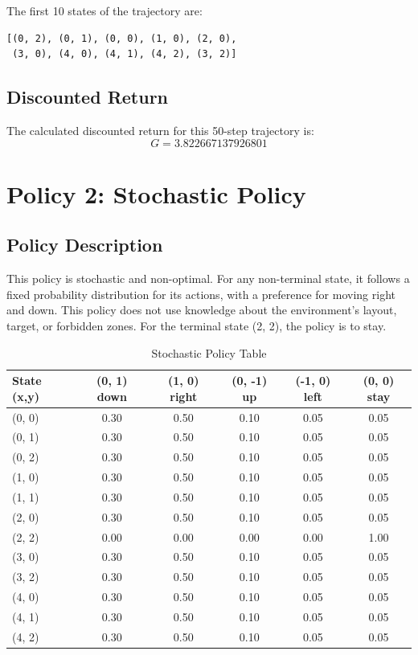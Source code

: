 \documentclass[12pt]{article}
\begin{document}
The first 10 states of the trajectory are:
\begin{verbatim}
[(0, 2), (0, 1), (0, 0), (1, 0), (2, 0),
 (3, 0), (4, 0), (4, 1), (4, 2), (3, 2)]
\end{verbatim}


\subsection{Discounted Return}
The calculated discounted return for this 50-step trajectory is:
$$ G = 3.822667137926801 $$

\newpage
\section{Policy 2: Stochastic Policy}

\subsection{Policy Description}
This policy is stochastic and non-optimal. For any non-terminal state, it follows a fixed probability distribution for its actions, with a preference for moving right and down. This policy does not use knowledge about the environment's layout, target, or forbidden zones. For the terminal state (2, 2), the policy is to stay.

\begin{table}[h!]
\centering
\caption{Stochastic Policy Table}
\begin{tabular}{lccccc}
\toprule
\textbf{State (x,y)} & \textbf{(0, 1) down} & \textbf{(1, 0) right} & \textbf{(0, -1) up} & \textbf{(-1, 0) left} & \textbf{(0, 0) stay} \\
\midrule
(0, 0) & 0.30 & 0.50 & 0.10 & 0.05 & 0.05 \\
(0, 1) & 0.30 & 0.50 & 0.10 & 0.05 & 0.05 \\
(0, 2) & 0.30 & 0.50 & 0.10 & 0.05 & 0.05 \\
(1, 0) & 0.30 & 0.50 & 0.10 & 0.05 & 0.05 \\
(1, 1) & 0.30 & 0.50 & 0.10 & 0.05 & 0.05 \\
(2, 0) & 0.30 & 0.50 & 0.10 & 0.05 & 0.05 \\
(2, 2) & 0.00 & 0.00 & 0.00 & 0.00 & 1.00 \\
(3, 0) & 0.30 & 0.50 & 0.10 & 0.05 & 0.05 \\
(3, 2) & 0.30 & 0.50 & 0.10 & 0.05 & 0.05 \\
(4, 0) & 0.30 & 0.50 & 0.10 & 0.05 & 0.05 \\
(4, 1) & 0.30 & 0.50 & 0.10 & 0.05 & 0.05 \\
(4, 2) & 0.30 & 0.50 & 0.10 & 0.05 & 0.05 \\
\bottomrule
\end{tabular}
\end{table}
\end{document}
